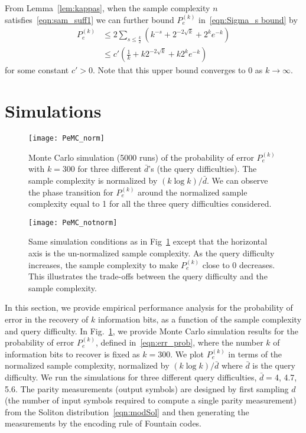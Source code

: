 \documentclass[11pt,onecolumn]{IEEEtran}
\newcommand{\beq}{\begin{equation}}
\newcommand{\eeq}{\end{equation}}
\newcommand{\bard}{\bar{d}}
\begin{document}
From Lemma~\ref{lem:kappas}, when the sample complexity $n$ satisfies~\eqref{eqn:sam_suff1} we can further bound $P_e^{(k)}$ in~\eqref{eqn:Sigma_s bound} by
\beq
\begin{aligned}
P_e^{(k)}&\leq 2\sum_{s \leq \frac{k}{2}} \left(k^{-s}+2^{-2\sqrt{k}}+2^k e^{-k}\right)\\
&\leq c'\left(\frac{1}{k}+k2^{-2\sqrt{k}}+k2^ke^{-k}\right)
\end{aligned}
\eeq
for some constant $c'>0$. Note that this upper bound converges to 0 as $k\to\infty$. 


\section{Simulations}\label{sec:sim}
\begin{figure}[t]
\centerline{\texttt{[image: PeMC\_norm]}}
\caption{Monte Carlo simulation (5000 runs) of the probability of error $P_e^{(k)}$ with $k=300$ for three different $\bard$'s (the query difficulties). The sample complexity is normalized by $(k\log k)/\bard$. %
We can observe the phase transition for $P_e^{(k)}$ around the normalized sample complexity equal to 1 for all the three query difficulties considered.}
\label{fig:PeMC}
\end{figure}

\begin{figure}[t]
\centerline{\texttt{[image: PeMC\_notnorm]}}
\caption{Same simulation conditions as in Fig~\ref{fig:PeMC} except that the horizontal axis is the un-normalized sample complexity. As the query difficulty increases, the sample complexity to make $P_e^{(k)}$ close to 0 decreases. This illustrates the trade-offs between the query difficulty and the sample complexity. }
\label{fig:PeMCnotnorm}
\end{figure}


In this section, we provide empirical performance analysis for the probability of error in the recovery of $k$ information bits, as a function of the sample complexity and query difficulty.
In Fig.~\ref{fig:PeMC}, we provide Monte Carlo simulation results for the probability of error $P_e^{(k)}$, defined in~\eqref{eqn:err_prob}, where the number $k$ of information bits to recover is fixed as $k=300$.
We plot $P_e^{(k)}$ in terms of the normalized sample complexity, normalized by $(k\log k)/\bard$ where $\bard$ is the query difficulty. We run the simulations for three different query difficulties, $\bard=$4, 4.7, 5.6.
The parity measurements (output symbols) are designed by first sampling $d$ (the number of input symbols required to compute a single parity measurement) from the Soliton distribution~\eqref{eqn:modSol} and then generating the measurements by the encoding rule of Fountain codes. 
\end{document}
